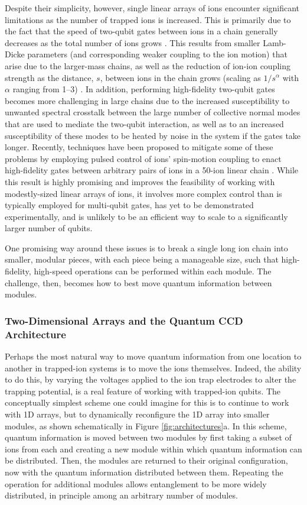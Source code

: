 \documentclass[%
reprint,
 amsmath,amssymb,
]{revtex4-1}
\begin{document}
Despite their simplicity, however, single linear arrays of ions encounter significant limitations as the number of trapped ions is increased.  This is primarily due to the fact that the speed of two-qubit gates between ions in a chain generally decreases as the total number of ions grows \cite{MonroeModularArch2014}.  This results from smaller Lamb-Dicke parameters (and corresponding weaker coupling to the ion motion) that arise due to the larger-mass chains, as well as the reduction of ion-ion coupling strength as the distance, $s$, between ions in the chain grows (scaling as $1/s^{\alpha}$ with $\alpha$ ranging from 1--3) \cite{LeungArbitraryEntangling2018}.  In addition, performing high-fidelity two-qubit gates becomes more challenging in large chains due to the increased susceptibility to unwanted spectral crosstalk between the large number of collective normal modes that are used to mediate the two-qubit interaction, as well as to an increased susceptibility of these modes to be heated by noise in the system if the gates take longer.  Recently, techniques have been proposed to mitigate some of these problems by employing pulsed control of ions' spin-motion coupling to enact high-fidelity gates between arbitrary pairs of ions in a 50-ion linear chain \cite{ZhuArbitrarySpeed2006,LeungArbitraryEntangling2018}.  While this result is highly promising and improves the feasibility of working with modestly-sized linear arrays of ions, it involves more complex control than is typically employed for multi-qubit gates, has yet to be demonstrated experimentally, and is unlikely to be an efficient way to scale to a significantly larger number of qubits.

One promising way around these issues is to break a single long ion chain into smaller, modular pieces, with each piece being a manageable size, such that high-fidelity, high-speed operations can be performed within each module.  The challenge, then, becomes how to best move quantum information between modules.

    \subsubsection{Two-Dimensional Arrays and the Quantum CCD Architecture}
    \label{2DArrays}
Perhaps the most natural way to move quantum information from one location to another in trapped-ion systems is to move the ions themselves.  Indeed, the ability to do this, by varying the voltages applied to the ion trap electrodes to alter the trapping potential, is a real feature of working with trapped-ion qubits.  The conceptually simplest scheme one could imagine for this is to continue to work with 1D arrays, but to dynamically reconfigure the 1D array into smaller modules, as shown schematically in Figure \ref{fig:architectures}a.  In this scheme, quantum information is moved between two modules by first taking a subset of ions from each and creating a new module within which quantum information can be distributed.  Then, the modules are returned to their original configuration, now with the quantum information distributed between them. Repeating the operation for additional modules allows entanglement to be more widely distributed, in principle among an arbitrary number of modules.
\end{document}
